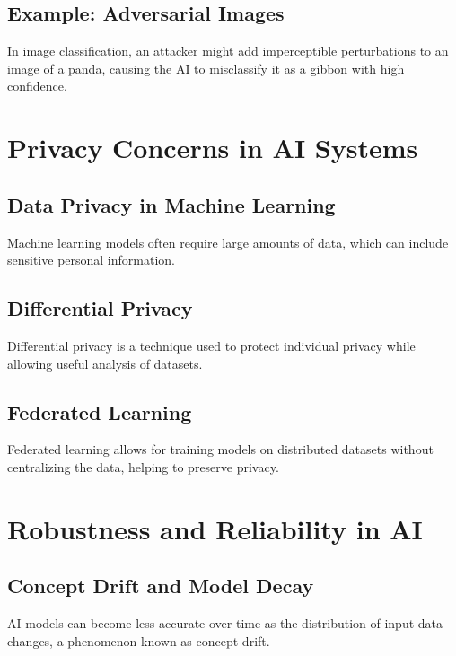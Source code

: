 \subsection{Example: Adversarial Images}
\begin{example}
In image classification, an attacker might add imperceptible perturbations to an image of a panda, causing the AI to misclassify it as a gibbon with high confidence.
\end{example}

\section{Privacy Concerns in AI Systems}

\subsection{Data Privacy in Machine Learning}

Machine learning models often require large amounts of data, which can
include sensitive personal information.

\subsection{Differential Privacy}

Differential privacy is a technique used to protect individual privacy
while allowing useful analysis of datasets.

\subsection{Federated Learning}

Federated learning allows for training models on distributed datasets
without centralizing the data, helping to preserve privacy.

\section{Robustness and Reliability in AI}

\subsection{Concept Drift and Model Decay}

AI models can become less accurate over time as the distribution of
input data changes, a phenomenon known as concept drift.


